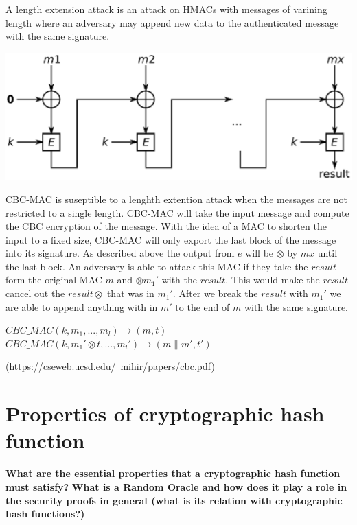 \documentclass[letterpaper,11pt,notitlepage,fleqn]{article}
\begin{document}
A length extension attack is an attack on HMACs with messages of varining length where an adversary may append new data to the authenticated message with the same signature. 
\begin{center}
    \includegraphics{cbcmac.eps}\\[1cm] %
\end{center}
\indent CBC-MAC is suseptible to a lenghth extention attack when the messages are not restricted to a single length. CBC-MAC will take the input message and compute the CBC encryption of the message. With the idea of a MAC to shorten the input to a fixed size, CBC-MAC will only export the last block of the message into its signature. As described above the output from $e$ will be $\otimes$ by $mx$ until the last block. An adversary is able to attack this MAC if they take the $result$ form
the original MAC $m$ and $\otimes m_{1}'$ with the $result$. This would make the $result$ cancel out the $result \otimes$ that was in $m_{1}'$. After we break the $result$ with $m_{1}'$ we are able to append anything with in $m'$ to the end of $m$ with the same signature.
\begin{center}
    $CBC\_MAC(k,m_{1},..., m_{l}) \rightarrow (m,t)$ \\ $CBC\_MAC(k,m_{1}' \otimes t, ..., m_{l}') \rightarrow (m\|m',t')$
\end{center}
(https://cseweb.ucsd.edu/~mihir/papers/cbc.pdf)

\section{Properties of cryptographic hash function}
\noindent \textbf{What are the essential properties that a cryptographic hash function must satisfy?}
\noindent \textbf{What is a Random Oracle and how does it play a role in the security proofs in general 
(what is its relation with cryptographic hash functions?)}

\medskip
 


\end{document}
